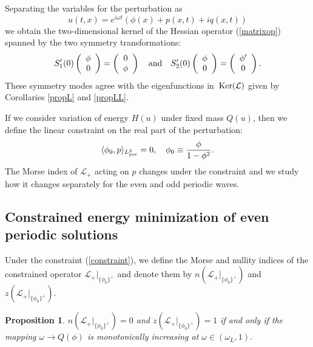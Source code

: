 \documentclass[12pt,reqno]{amsart}
\newcommand{\Ker}{{\rm \,Ker}}
\numberwithin{equation}{section}
\numberwithin{figure}{section}
\newtheorem{proposition}[theorem]{Proposition}
\begin{document}
Separating the variables for the perturbation as 
$$
u(t,x)=e^{i\omega t} \left( \phi(x) + p(x,t) + i q(x,t) \right)
$$
we obtain the two-dimensional kernel of the Hessian operator 
(\ref{matrixop}) spanned by the two symmetry transformations:
$$
S_1'(0) \left(
\begin{array}{c}
\phi \\ 0
\end{array}
\right) = \left(
\begin{array}{c}
0 \\ \phi
\end{array}
\right) \quad \mbox{\rm and} \quad 
S_2'(0) \left(
\begin{array}{c}
\phi \\ 0
\end{array}
\right) = \left(
\begin{array}{c}
\phi' \\ 0
\end{array}
\right).
$$
These symmetry modes agree with the eigenfunctions in $\Ker(\mathcal{L})$ given by Corollaries \ref{propL} and \ref{propLL}. 

If we consider variation of energy $H(u)$ under fixed mass $Q(u)$, then we define the linear constraint on the real part of the perturbation:
\begin{equation}
\label{constraint}
\langle \phi_0, p \rangle_{L^2_{\rm per}} = 0, \quad \phi_0 \equiv  \frac{\phi}{1-\phi^2}.
\end{equation}
The Morse index of $\mathcal{L}_+$ acting on $p$ changes under the constraint
and we study how it changes separately for the even and odd periodic waves. 

\subsection{Constrained energy minimization of even periodic solutions} 

Under the constraint (\ref{constraint}), we define the Morse and nullity indices 
of the constrained operator $\mathcal{L}_+ |_{\{ \phi_0\}^{\perp}}$ 
and denote them by $n(\mathcal{L}_+ |_{\{ \phi_0\}^{\perp}})$ and $z(\mathcal{L}_+ |_{\{ \phi_0\}^{\perp}})$. 

\begin{proposition}\label{propR0-constraint}
	$n(\mathcal{L}_+ |_{\{ \phi_0\}^{\perp}}) = 0$ and $z(\mathcal{L}_+ |_{\{ \phi_0\}^{\perp}}) = 1$ if and only if the mapping $\omega \to Q(\phi)$ is monotonically increasing at $\omega \in (\omega_L,1)$.
\end{proposition}
\end{document}
